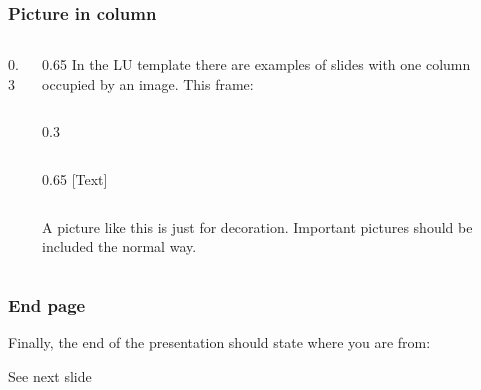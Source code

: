\documentclass[aspectratio=1610]{beamer}
\begin{document}
\begin{frame}[fragile]
  \frametitle{Picture in column}
  \begin{columns}[onlytextwidth]
    \begin{column}{0.3\linewidth}
    \end{column}%
    \begin{column}{0.65\linewidth}
      In the LU template there are examples of slides with one column occupied by an image. This frame:
\begin{CodeBox}{}
\begin{columns}[onlytextwidth]
  \begin{column}{0.3\textwidth}
  \end{column}
\end{columns}%
\begin{column}{0.65\textwidth}
  [Text]
\end{column}
\end{CodeBox}      
      A picture like this is just for decoration. Important pictures should be included the normal way.
    \end{column}
  \end{columns}
\end{frame}

\begin{frame}
  \frametitle{End page}
  Finally, the end of the presentation should state where you are from:
\begin{CodeBox}{}
\begin{frame}[plain]
  \endpage
\end{frame}%
\end{CodeBox}
  See next slide
\end{frame}

\begin{frame}[plain]
  \endpage
\end{frame}

\end{document}

